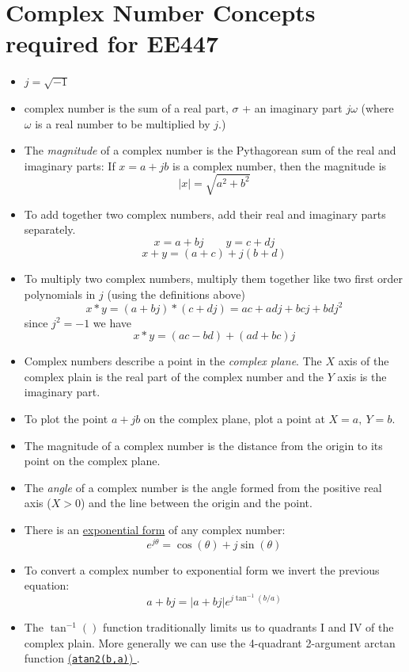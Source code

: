 \section{Complex Number Concepts required for EE447}\label{cnconcepts}
\begin{itemize}
  \item $j = \sqrt{-1}$
  \item complex number is the sum of a real part, $\sigma$ + an imaginary part $j\omega$ (where $\omega$ is a real number to be multiplied by $j$.)
  \item   The {\it magnitude} of a complex number is the Pythagorean sum of the real and imaginary parts:
  If $x= a+jb$ is a complex number, then the magnitude is
  \[
  |x| = \sqrt{a^2+b^2}
  \]
  \item To add together two complex numbers, add their real and imaginary parts separately.
  \[
  x = a+bj \qquad y = c+dj
  \]
  \[
  x + y = (a+c) + j(b+d)
  \]
  \item To multiply two complex numbers, multiply them together like two first order polynomials in $j$ (using the definitions above)
  \[
  x*y = (a+bj)*(c+dj) = ac+adj + bcj+bdj^2
  \]
  since $j^2=-1$ we have
  \[
  x*y = (ac-bd)+(ad+bc)j
  \]

  \item Complex numbers describe a point in the {\it complex plane}.  The $X$ axis of the complex plain is the real part of the complex number and the $Y$ axis is the imaginary part.

  \item To plot the point $a+jb$ on the complex plane, plot a point at $X = a, \: Y = b$.

  \item The magnitude of a complex number is the distance from the origin to its point on the complex plane.

  \item The {\it angle} of a complex number is the angle formed from the positive real axis ($X>0$) and the line between the origin and the point.

  \item There is an \href{http://en.wikipedia.org/wiki/Euler\%27s_formula}{exponential form} of any complex number:
  \[
  e^{j\theta} = \cos(\theta) + j\sin(\theta)
  \]
  \item To convert a complex number to exponential form we invert the previous equation:
  \[
  a+bj = |a+bj| e^{j\tan^{-1}(b/a)}
  \]

  \item The $\tan^{-1}()$ function traditionally limits us to quadrants I and IV of the complex plain.    More generally we can use the 4-quadrant 2-argument arctan function \href{http://en.wikipedia.org/wiki/Atan2}{({\tt atan2(b,a)}) }.


\end{itemize}
